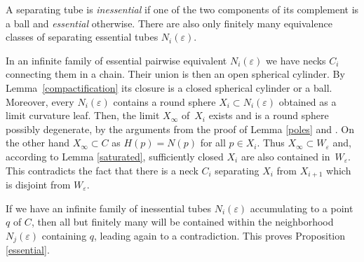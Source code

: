 \documentclass[JEP,XML,SOM,Unicode]{cedram}
\theoremstyle{definition}
\theoremstyle{remark}
\numberwithin{equation}{section}
\begin{document}
A separating tube is \emph{inessential} if one of the two
components of its complement is a ball and \emph{essential} otherwise.
There are also only finitely many equivalence classes of separating
essential tubes $N_i(\varepsilon)$.

In an infinite family of essential pairwise equivalent $N_i(\varepsilon)$ we have necks $C_i$
connecting them in a chain. Their union is then an open spherical cylinder.
By Lemma~\ref{compactification} its closure is a closed
spherical cylinder or a ball. Moreover, every $N_i(\varepsilon)$ contains
a round sphere $X_i\subset N_i(\varepsilon)$ obtained as a limit
curvature leaf. Then, the limit $X_{\infty}$ of~$X_i$ exists and is a
round sphere possibly degenerate, by the arguments from the proof of Lemma \ref{poles} and \cite{DDM}. On the
other hand $X_{\infty}\subset C$ as $H(p)=N(p)$ for all $p\in X_i$.
Thus $X_{\infty}\subset W_{\varepsilon}$ and, according to Lemma \ref{saturated},
sufficiently closed $X_i$ are also contained in~$W_{\varepsilon}$. This
contradicts the fact that there is a neck $C_i$ separating $X_i$
from $X_{i+1}$ which is disjoint from $W_{\varepsilon}$.

If we have an infinite family of inessential tubes $N_i(\varepsilon)$ accumulating to a point~$q$ of $C$, then
all but finitely many will be contained within the neighborhood $N_j(\varepsilon)$ containing $q$, leading again to a contradiction.
This proves Proposition \ref{essential}.
\end{document}
